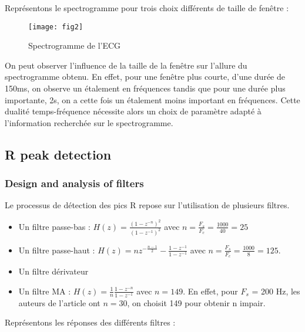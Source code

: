 \documentclass[12pt,a4paper,titlepage]{article}
\begin{document}
Représentons le spectrogramme pour trois choix différents de taille de fenêtre :

\begin{figure}[H]
    \caption{Spectrogramme de l'ECG}
    \texttt{[image: fig2]}
    \centering
\end{figure}

On peut observer l'influence de la taille de la fenêtre sur l'allure du spectrogramme obtenu.
En effet, pour une fenêtre plus courte, d'une durée de 150ms, on observe un étalement en fréquences tandis que
pour une durée plus importante, 2s, on a cette fois un étalement moins important en fréquences.
Cette dualité temps-fréquence nécessite alors un choix de paramètre adapté à l'information
recherchée sur le spectrogramme.

\subsection{R peak detection}

\subsubsection{Design and analysis of filters}

Le processus de détection des pics R repose sur l'utilisation de plusieurs filtres.

\begin{itemize}
    \item{Un filtre passe-bas : $H(z) = \frac{(1-z^{-n})^2}{(1-z^{-1})^2}$ avec
        $n = \frac{F_s}{F_c} = \frac{1000}{40} = 25$}
    \item{Un filtre passe-haut : $H(z) = nz^{-\frac{n-1}{2}} - \frac{1-z^{-1}}{1-z^{-1}}$
        avec $n = \frac{F_s}{F_c} =\frac{1000}{8} = 125$.}
    \item{Un filtre dérivateur}
    \item{Un filtre MA : $H(z) = \frac{1}{n} \frac{1-z^{-n}}{1-z^{-1}}$ avec 
            $n = 149$. En effet, pour $F_s$ = 200 Hz, les auteurs de l'article ont $n = 30$,
        on choisit 149 pour obtenir n impair.}
\end{itemize}

Représentons les réponses des différents filtres :
\end{document}
